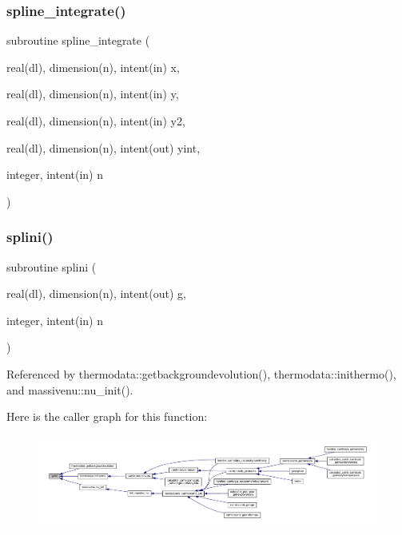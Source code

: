 \mbox{\label{subroutines_8f90_a810dcbf1c971281d698fb5f043322c5f}} 
\subsubsection{\texorpdfstring{spline\+\_\+integrate()}{spline\_integrate()}}
{\footnotesize\ttfamily subroutine spline\+\_\+integrate (\begin{DoxyParamCaption}\item[{real(dl), dimension(n), intent(in)}]{x,  }\item[{real(dl), dimension(n), intent(in)}]{y,  }\item[{real(dl), dimension(n), intent(in)}]{y2,  }\item[{real(dl), dimension(n), intent(out)}]{yint,  }\item[{integer, intent(in)}]{n }\end{DoxyParamCaption})}

\mbox{\label{subroutines_8f90_a67a919c1c3599a4f59a5a4865a4488e4}} 
\subsubsection{\texorpdfstring{splini()}{splini()}}
{\footnotesize\ttfamily subroutine splini (\begin{DoxyParamCaption}\item[{real(dl), dimension(n), intent(out)}]{g,  }\item[{integer, intent(in)}]{n }\end{DoxyParamCaption})}



Referenced by thermodata\+::getbackgroundevolution(), thermodata\+::inithermo(), and massivenu\+::nu\+\_\+init().

Here is the caller graph for this function\+:
\nopagebreak
\begin{figure}[H]
\begin{center}
\leavevmode
\includegraphics[width=350pt]{subroutines_8f90_a67a919c1c3599a4f59a5a4865a4488e4_icgraph}
\end{center}
\end{figure}
\mbox{\label{subroutines_8f90_a5cc3dda624e58340fa2d833b839c3b95}} 
